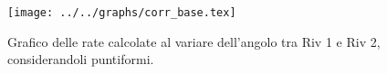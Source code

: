 \begin{figure}[h] \centering\texttt{[image: ../../graphs/corr\_base.tex]}\caption{Grafico delle rate calcolate al variare dell'angolo tra Riv 1 e Riv 2, considerandoli puntiformi.}\label{gr:corr_base} \end{figure}
